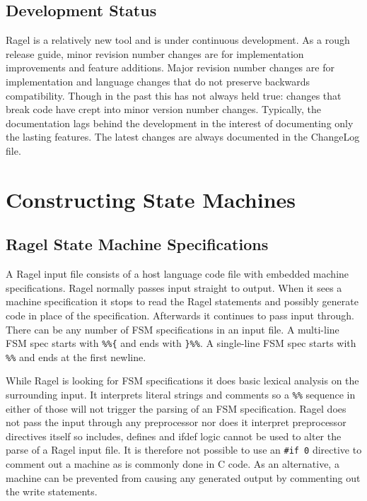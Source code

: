 \documentclass[letterpaper,11pt,oneside]{book}
\begin{document}
\section{Development Status}

Ragel is a relatively new tool and is under continuous development. As a rough
release guide, minor revision number changes are for implementation
improvements and feature additions. Major revision number changes are for
implementation and language changes that do not preserve backwards
compatibility. Though in the past this has not always held true: changes that
break code have crept into minor version number changes. Typically, the
documentation lags behind the development in the interest of documenting only
the lasting features. The latest changes are always documented in the ChangeLog
file. 

\chapter{Constructing State Machines}

\section{Ragel State Machine Specifications}

A Ragel input file consists of a host language code file with embedded machine
specifications.  Ragel normally passes input straight to output.  When it sees
a machine specification it stops to read the Ragel statements and possibly generate
code in place of the specification.
Afterwards it continues to pass input through.  There
can be any number of FSM specifications in an input file. A multi-line FSM spec
starts with \verb|%%{| and ends with \verb|}%%|. A single-line FSM spec starts
with \verb|%%| and ends at the first newline.  

While Ragel is looking for FSM specifications it does basic lexical analysis on
the surrounding input. It interprets literal strings and comments so a
\verb|%%| sequence in either of those will not trigger the parsing of an FSM
specification. Ragel does not pass the input through any preprocessor nor does it
interpret preprocessor directives itself so includes, defines and ifdef logic
cannot be used to alter the parse of a Ragel input file. It is therefore not
possible to use an \verb|#if 0| directive to comment out a machine as is
commonly done in C code. As an alternative, a machine can be prevented from
causing any generated output by commenting out the write statements.
\end{document}
